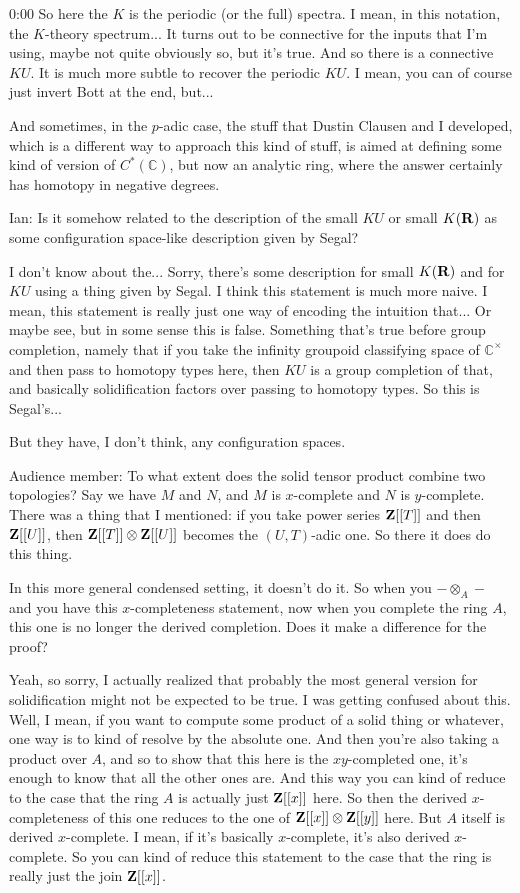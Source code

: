 \begin{unfinished}{0:00}
So here the $K$ is the periodic (or the full) spectra. I mean, in this notation, the $K$-theory spectrum... It turns out to be connective for the inputs that I'm using, maybe not quite obviously so, but it's true. And so there is a connective $KU$. It is much more subtle to recover the periodic $KU$. I mean, you can of course just invert Bott at the end, but...

And sometimes, in the $p$-adic case, the stuff that Dustin Clausen and I developed, which is a different way to approach this kind of stuff, is aimed at defining some kind of version of $C^*(\mathbb{C})$, but now an analytic ring, where the answer certainly has homotopy in negative degrees.

Ian: Is it somehow related to the description of the small $KU$ or small $K(\mathbf R)$ as some configuration space-like description given by Segal?

I don't know about the... Sorry, there's some description for small $K(\mathbf R)$ and for $KU$ using a thing given by Segal. I think this statement is much more naive. I mean, this statement is really just one way of encoding the intuition that... Or maybe see, but in some sense this is false. Something that's true before group completion, namely that if you take the infinity groupoid classifying space of $\mathbb{C}^\times$ and then pass to homotopy types here, then $KU$ is a group completion of that, and basically solidification factors over passing to homotopy types. So this is Segal's...

But they have, I don't think, any configuration spaces.

Audience member: To what extent does the solid tensor product combine two topologies? Say we have $M$ and $N$, and $M$ is $x$-complete and $N$ is $y$-complete. There was a thing that I mentioned: if you take power series $\mathbf Z[[T]]$ and then $\mathbf Z[[U]]$, then $\mathbf Z[[T]] \otimes \mathbf Z[[U]]$ becomes the $(U,T)$-adic one. So there it does do this thing.

In this more general condensed setting, it doesn't do it. So when you $-\otimes_A-$ and you have this $x$-completeness statement, now when you complete the ring $A$, this one is no longer the derived completion. Does it make a difference for the proof?

Yeah, so sorry, I actually realized that probably the most general version for solidification might not be expected to be true. I was getting confused about this. Well, I mean, if you want to compute some product of a solid thing or whatever, one way is to kind of resolve by the absolute one. And then you're also taking a product over $A$, and so to show that this here is the $xy$-completed one, it's enough to know that all the other ones are. And this way you can kind of reduce to the case that the ring $A$ is actually just $\mathbf Z[[x]]$ here. So then the derived $x$-completeness of this one reduces to the one of $\mathbf Z[[x]] \otimes \mathbf Z[[y]]$ here. But $A$ itself is derived $x$-complete. I mean, if it's basically $x$-complete, it's also derived $x$-complete. So you can kind of reduce this statement to the case that the ring is really just the join $\mathbf Z[[x]]$.


\end{unfinished}
